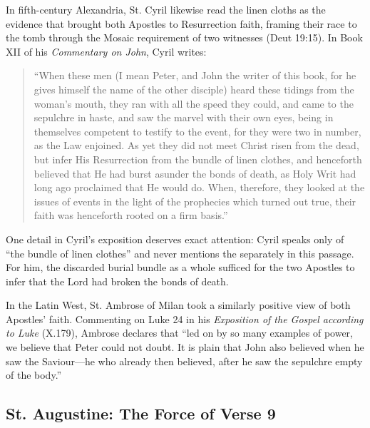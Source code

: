 In fifth-century Alexandria, St. Cyril likewise read the linen cloths as the evidence that brought both Apostles to Resurrection faith, framing their race to the tomb through the Mosaic requirement of two witnesses (Deut 19:15). In Book XII of his \emph{Commentary on John}, Cyril writes:
\begin{quote}
``When these men (I mean Peter, and John the writer of this book, for he gives himself the name of the other disciple) heard these tidings from the woman's mouth, they ran with all the speed they could, and came to the sepulchre in haste, and saw the marvel with their own eyes, being in themselves competent to testify to the event, for they were two in number, as the Law enjoined. As yet they did not meet Christ risen from the dead, but infer His Resurrection from the bundle of linen clothes, and henceforth believed that He had burst asunder the bonds of death, as Holy Writ had long ago proclaimed that He would do. When, therefore, they looked at the issues of events in the light of the prophecies which turned out true, their faith was henceforth rooted on a firm basis.''
\end{quote}
One detail in Cyril's exposition deserves exact attention: Cyril speaks only of ``the bundle of linen clothes'' and never mentions the  separately in this passage. For him, the discarded burial bundle as a whole sufficed for the two Apostles to infer that the Lord had broken the bonds of death.

In the Latin West, St. Ambrose of Milan took a similarly positive view of both Apostles' faith. Commenting on Luke 24 in his \emph{Exposition of the Gospel according to Luke} (X.179), Ambrose declares that ``led on by so many examples of power, we believe that Peter could not doubt. It is plain that John also believed when he saw the Saviour---he who already then believed, after he saw the sepulchre empty of the body.''

\subsection{St. Augustine: The Force of Verse 9}

